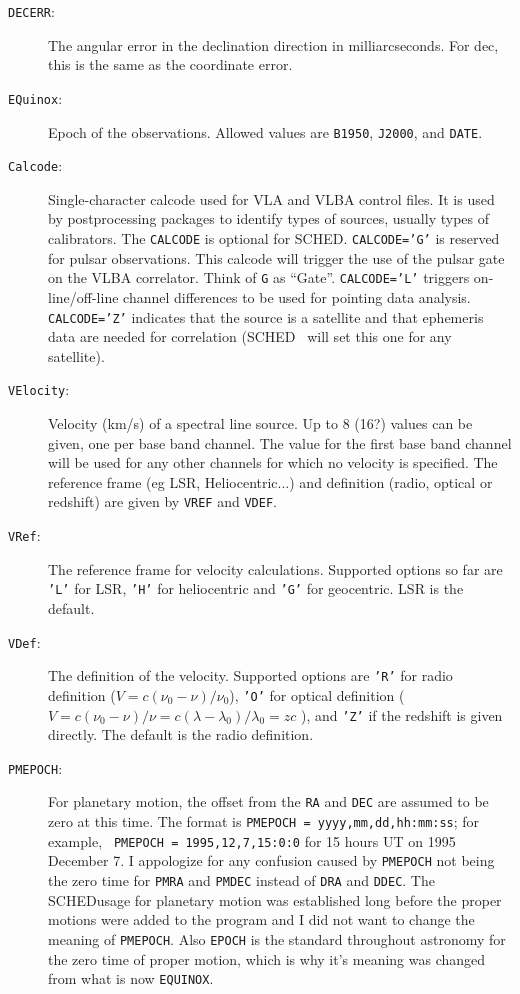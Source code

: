 \documentclass{report}
\newcommand{\sched}{{\sc SCHED}}
\newcommand{\schedb}{{\sc SCHED~}}
\begin{document}
\begin{description}
\item [{\tt DECERR}:] The angular error in the declination direction in
milliarcseconds.  For dec, this is the same as the coordinate error.

\item [{\tt EQuinox}:] Epoch of the observations. Allowed values are
{\tt B1950}, {\tt J2000}, and {\tt DATE}.

\item [{\tt Calcode}:] Single-character calcode used for VLA and VLBA
control files. It is used by postprocessing packages to identify types
of sources, usually types of calibrators.  The {\tt CALCODE} is
optional for \sched.  {\tt CALCODE='G'} is reserved for pulsar
observations.  This calcode will trigger the use of the pulsar gate on
the VLBA correlator.  Think of {\tt G} as ``Gate''.  {\tt CALCODE='L'}
triggers on-line/off-line channel differences to be used for pointing
data analysis.  {\tt CALCODE='Z'} indicates that the source is a
satellite and that ephemeris data are needed for correlation (\schedb
will set this one for any satellite).

\item [{\tt VElocity}:] Velocity (km/s) of a spectral line
source. Up to 8 (16?) values can be given, one per base band
channel. The value for the first base band channel will be used for
any other channels for which no velocity is specified.  The
reference frame (eg LSR, Heliocentric...) and definition
(radio, optical or redshift) are given by {\tt VREF} and
{\tt VDEF}.

\item [{\tt VRef}:] The reference frame for velocity calculations.
Supported options so far are {\tt 'L'} for LSR, {\tt 'H'}
for heliocentric and {\tt 'G'} for geocentric.  LSR is the default.

\item [{\tt VDef}:] The definition of the velocity.  Supported options
are {\tt 'R'} for radio definition ($ V=c ( \nu_0 - \nu) / \nu_0$),
{\tt 'O'} for optical definition ( $ V= c ( \nu_0 - \nu ) / \nu = c (
\lambda - \lambda_0 ) / \lambda_0 = zc $ ), and {\tt 'Z'} if the
redshift is given directly.  The default is the radio definition.

\item [{\tt PMEPOCH}:] For planetary motion, the offset
from the {\tt RA} and {\tt DEC} are assumed to be zero at this time.
The format is {\tt PMEPOCH = yyyy,mm,dd,hh:mm:ss}; for example, {\tt
PMEPOCH = 1995,12,7,15:0:0} for 15 hours UT on 1995 December 7.
I appologize for any confusion caused by {\tt PMEPOCH} not being the
zero time for {\tt PMRA} and {\tt PMDEC} instead of {\tt DRA} and
{\tt DDEC}.  The \sched usage for planetary motion was established
long before the proper motions were added to the program and I did
not want to change the meaning of {\tt PMEPOCH}.  Also {\tt EPOCH}
is the standard throughout astronomy for the zero time of proper motion,
which is why it's meaning was changed from what is now {\tt EQUINOX}.


\end{description}
\end{document}
